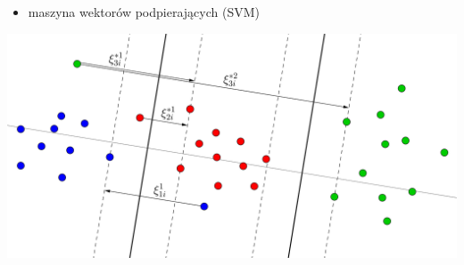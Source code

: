 \documentclass[11pt,usenames,dvipsnames,rgb,svgnames,x11names]{beamer}
\theoremstyle{plain}
\theoremstyle{definition}
\theoremstyle{remark}
\begin{document}
\begin{frame}
\begin{itemize}
\item maszyna wektorów podpierających (SVM)
\end{itemize}
\vspace{4mm}
\includegraphics[scale=0.3]{svm3_dobre.png}
\end{frame}
\end{document}
